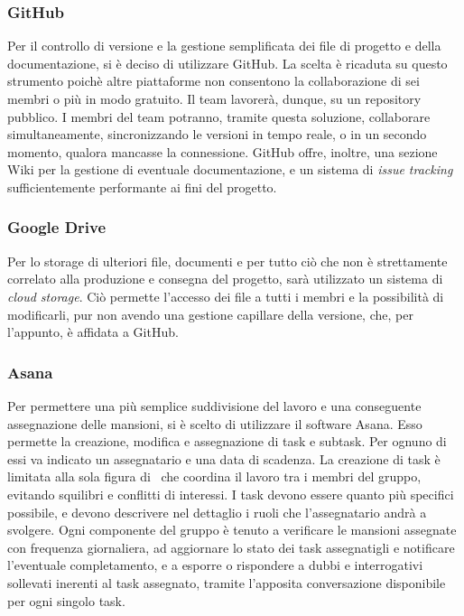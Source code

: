 		\subsubsection{GitHub}
		Per il controllo di versione e la gestione semplificata dei file di progetto e della documentazione, si è deciso di utilizzare GitHub. La scelta è ricaduta su questo strumento poichè altre piattaforme non consentono la collaborazione di sei membri o più in modo gratuito. Il team lavorerà, dunque, su un repository pubblico. I membri del team potranno, tramite questa soluzione, collaborare simultaneamente, sincronizzando le versioni in tempo reale, o in un secondo momento, qualora mancasse la connessione. GitHub offre, inoltre, una sezione Wiki per la gestione di eventuale documentazione, e un sistema di \textit{issue tracking} sufficientemente performante ai fini del progetto.

		\subsubsection{Google Drive}
		Per lo storage di ulteriori file, documenti e per tutto ciò che non è strettamente correlato alla produzione e consegna del progetto, sarà utilizzato un sistema di \textit{cloud storage}. Ciò permette l'accesso dei file a tutti i membri e la possibilità di modificarli, pur non avendo una gestione capillare della versione, che, per l'appunto, è affidata a GitHub.

		\subsubsection{Asana}
		Per permettere una più semplice suddivisione del lavoro e una conseguente assegnazione delle mansioni, si è scelto di utilizzare il software Asana. Esso permette la creazione, modifica e assegnazione di task e subtask. Per ognuno di essi va indicato un assegnatario e una data di scadenza. La creazione di task è limitata alla sola figura di \RdP\, che coordina il lavoro tra i membri del gruppo, evitando squilibri e conflitti di interessi. I task devono essere quanto più specifici possibile, e devono descrivere nel dettaglio i ruoli che l'assegnatario andrà a svolgere. Ogni componente del gruppo è tenuto a verificare le mansioni assegnate con frequenza giornaliera, ad aggiornare lo stato dei task assegnatigli e notificare l'eventuale completamento, e a esporre o rispondere a dubbi e interrogativi sollevati inerenti al task assegnato, tramite l'apposita conversazione disponibile per ogni singolo task.